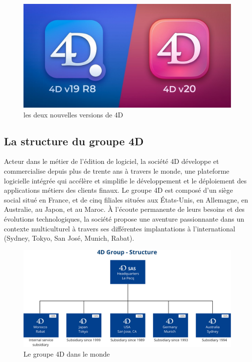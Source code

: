 \vspace{0.5cm}

\begin{figure}[h]
    \centering
    \includegraphics[scale=0.3]{Figures/v19v20.jpg} %
    \caption{les deux nouvelles versions de 4D}
    \label{fig:v19v20}
\end{figure}



\subsection{La structure du groupe 4D}
Acteur dans le métier de l’édition de logiciel, la société
4D développe et commercialise depuis plus de trente 
ans à travers le monde, une plateforme logicielle 
intégrée qui accélère et simplifie le développement
et le déploiement des applications métiers des clients finaux.
Le groupe 4D est composé d’un siège social situé en France, 
et de cinq filiales situées aux États-Unis, en Allemagne, 
en Australie, au Japon, et au Maroc. À l’écoute permanente 
de leurs besoins et des évolutions technologiques, 
la société propose une aventure passionnante dans un 
contexte multiculturel à travers ses différentes implantations 
à l’international (Sydney, Tokyo, San José, Munich, Rabat).

\vspace{1cm}

\begin{figure}[h]
    \centering
    \includegraphics[scale=0.35]{Figures/groupe.png} %
    \caption{Le groupe 4D dans le monde}
    \label{fig:groupe}
\end{figure}

